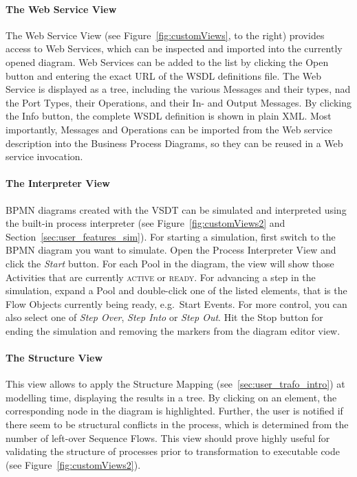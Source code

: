 \paragraph*{The Web Service View}
The Web Service View (see Figure~\ref{fig:customViews}, to the right) provides access to Web
Services, which can be inspected and imported into the currently opened diagram. Web Services can be
added to the list by clicking the Open button and entering the exact URL of the WSDL definitions
file. The Web Service is displayed as a tree, including the various Messages and their types, nad
the Port Types, their Operations, and their In- and Output Messages. By clicking the Info button,
the complete WSDL definition is shown in plain XML. Most importantly, Messages and Operations can be
imported from the Web service description into the Business Process Diagrams, so they can be reused
in a Web service invocation.


\paragraph*{The Interpreter View}
\label{sec:user_perspective_simView}
BPMN diagrams created with the VSDT can be simulated and interpreted using the built-in process
interpreter (see Figure~\ref{fig:customViews2} and Section~\ref{sec:user_features_sim}). For
starting a simulation, first switch to the BPMN diagram you want to simulate. Open the Process
Interpreter View and click the \emph{Start} button. For each Pool in the diagram, the view will show
those Activities that are currently \textsc{active} or \textsc{ready}. For advancing a step in the
simulation, expand a Pool and double-click one of the listed elements, that is the Flow Objects
currently being ready, e.g.\ Start Events. For more control, you can also select one of \emph{Step
Over}, \emph{Step Into} or \emph{Step Out}. Hit the Stop button for ending the simulation and
removing the markers from the diagram editor view.

\paragraph*{The Structure View}
\label{sec:user_perspective_strucView}
This view allows to apply the Structure Mapping (see~\ref{sec:user_trafo_intro}) at modelling time,
displaying the results in a tree. By clicking on an element, the corresponding node in the diagram
is highlighted. Further, the user is notified if there seem to be structural conflicts in the
process, which is determined from the number of left-over Sequence Flows. This view should prove
highly useful for validating the structure of processes prior to transformation to executable code
(see Figure~\ref{fig:customViews2}).


